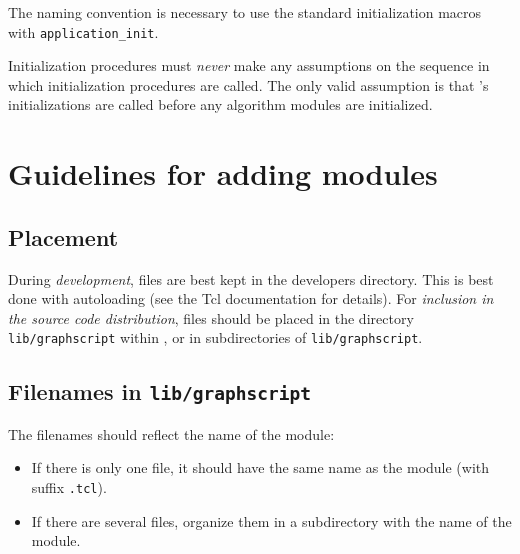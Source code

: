 \documentclass[twoside,fleqn]{report}
\begin{document}
\begin{notes}

  \item The naming convention is necessary to use the standard 
  initialization macros with \texttt{application\_init}.

  \item Initialization procedures must \emph{never} make any 
  assumptions on the sequence in which initialization procedures are 
  called.  The only valid assumption is that \Graphlet{}'s 
  initializations are called before any algorithm modules are 
  initialized.

\end{notes}




%
%

\section{Guidelines for adding \GraphScript{} modules}

\subsection{Placement}

During \emph{development}, \GraphScript{} files are best kept in the 
developers directory.  This is best done with autoloading (see the Tcl 
documentation for details).  For \emph{inclusion in the source code 
distribution}, \GraphScript{} files should be placed in the directory 
\texttt{lib/graphscript} within \Graphlet{}, or in subdirectories of 
\texttt{lib/graphscript}.


\subsection{Filenames in \texttt{lib/graphscript}}

The filenames should reflect the name of the module:
\begin{itemize}

  \item If there is only one \GraphScript{} file, it should have the 
  same name as the module (with suffix \texttt{.tcl}).
  
  \item If there are several files, organize them in a subdirectory 
  with the name of the module.
  
\end{itemize}
\end{document}
